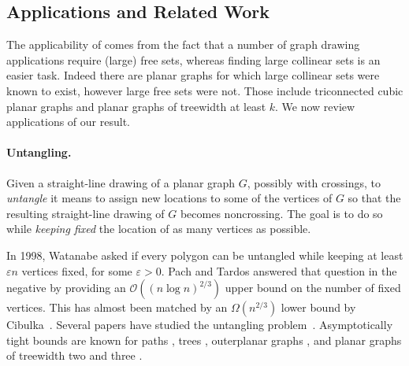 \subsection{Applications and Related Work}

The applicability of  comes from the fact that a number of graph drawing applications require (large) free sets, whereas finding large collinear sets
is an easier task. Indeed there are planar graphs for which large collinear sets were known to exist, however large free sets were not. Those include triconnected cubic planar graphs
and planar graphs of treewidth at least $k$.
%
We now review applications of our result. 



\paragraph{Untangling.}  Given a straight-line drawing of a planar
graph $G$, possibly with crossings, to \emph{untangle} it means to assign
new locations to some of the vertices of $G$ so that the resulting
straight-line drawing of $G$ becomes noncrossing. The goal is to do so while
\emph{keeping fixed} the location of
as many vertices as possible. %

In 1998, Watanabe asked if every polygon can be untangled while keeping at least $\varepsilon n$ vertices
fixed, for some $\varepsilon >0$. Pach and Tardos\cite{pt-up-02} answered that question in
the negative by providing an $\mathcal{O}((n\log n)^{2/3})$ upper bound on the
number of fixed vertices. This has almost been  matched by
an 
$\Omega(n^{2/3})$ lower bound by Cibulka~\cite{c-upg-10}. Several papers have studied the untangling
problem~\cite{pt-up-02,cano.toth.ea:upper,c-upg-10,bose.dujmovic.ea:polynomial,gkossw-upg-09, kpr-upg-11,ravsky.verbitsky:on}. Asymptotically tight
bounds are known for paths \cite{c-upg-10}, trees \cite{gkossw-upg-09}, outerplanar graphs
\cite{gkossw-upg-09}, and planar graphs of treewidth two and three \cite{ravsky.verbitsky:on,
  dalozzo.dujmovic.ea:drawing}. 
  
